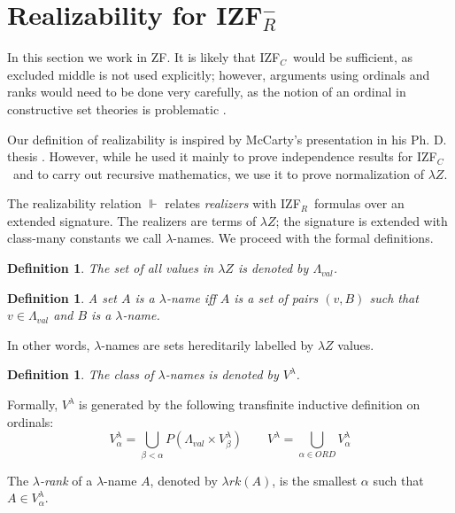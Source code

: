 \documentclass{LMCS}
\newtheorem{definition}[thm]{Definition}
\newcommand\reals{\ensuremath{\Vdash}}
\newcommand{\izfc}{IZF${}_C$}
\newcommand{\izfr}{IZF${}_R$}
\newcommand{\iizfr}{IZF${}_R^{-}$}
\newcommand{\li}{\lambda Z}
\newcommand{\lz}{\lambda Z}
\newcommand{\lrk}{\ensuremath{\lambda rk}}
\begin{document}
\newcommand\vl{V^{\lambda}}
\newcommand\vla{\vl_\alpha}
\newcommand\vlb{\vl_\beta}

\section{Realizability for \iizfr}\label{izfreal}

In this section we work in ZF. It is likely that \izfc\ would be sufficient, as excluded middle is not used explicitly; however, arguments using ordinals
and ranks would need to be done very carefully, as the notion of an ordinal
in constructive set theories is problematic \cite{powell, taylor96}.

Our definition of realizability is inspired by McCarty's presentation
in his Ph. D. thesis \cite{mccarty}. However, while he used it mainly to
prove independence results for \izfc\ and to carry out recursive mathematics,
we use it to prove normalization of $\lz$.

The realizability relation $\reals$ relates \emph{realizers} with \izfr\
formulas over an extended signature. The realizers are terms of $\lz$; the
signature is extended with class-many constants we call $\lambda$-names. We
proceed with the formal definitions.

\begin{definition}
The set of all values in $\lz$ is denoted by $\Lambda_{val}$. 
\end{definition}

\begin{definition}
A set $A$ is a $\lambda$-name iff $A$ is a set of pairs $(v, B)$ such that
$v \in \Lambda_{val}$ and $B$ is a $\lambda$-name.
\end{definition}

In other words, $\lambda$-names are sets hereditarily labelled by $\li$ values.

\begin{definition}
The class of $\lambda$-names is denoted by $\vl$.
\end{definition}

Formally, $V^\lambda$ is generated by the following transfinite inductive
definition on ordinals:
\[
V^\lambda_\alpha = \bigcup_{\beta \lt \alpha} P(\Lambda_{val} \times
V^\lambda_\beta) \qquad V^\lambda = \bigcup_{\alpha \in ORD}V^\lambda_\alpha
\]

The \emph{$\lambda$-rank} of a $\lambda$-name $A$, denoted by $\lrk(A)$, is the
smallest $\alpha$ such that $A \in \vla$.
\end{document}
